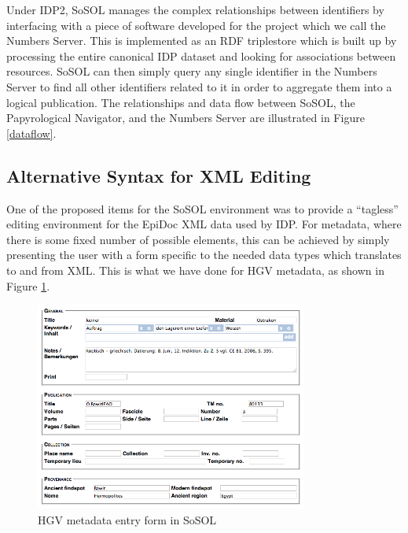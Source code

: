 \documentclass[]{article}
\begin{document}
Under IDP2, SoSOL manages the complex relationships between identifiers by interfacing with a piece of software developed for the project which we call the Numbers Server. This is implemented as an RDF triplestore which is built up by processing the entire canonical IDP dataset and looking for associations between resources. SoSOL can then simply query any single identifier in the Numbers Server to find all other identifiers related to it in order to aggregate them into a logical publication. The relationships and data flow between SoSOL, the Papyrological Navigator, and the Numbers Server are illustrated in Figure \ref{dataflow}.

\subsection*{Alternative Syntax for XML Editing}\nocite{xsugar}

One of the proposed items for the SoSOL environment was to provide a “tagless” editing environment for the EpiDoc XML data used by IDP. For metadata, where there is some fixed number of possible elements, this can be achieved by simply presenting the user with a form specific to the needed data types which translates to and from XML. This is what we have done for HGV metadata, as shown in Figure \ref{hgvmeta}.

\begin{figure}[!h]
  \centering
  \includegraphics[width=0.8\textwidth]{images/hgvmeta.png}
  \caption{HGV metadata entry form in SoSOL\label{hgvmeta}}
\end{figure}
\end{document}
